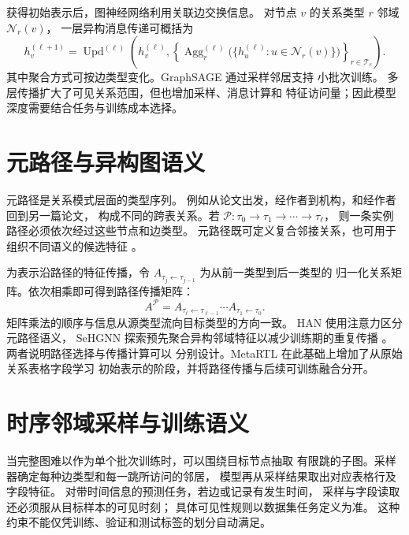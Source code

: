 获得初始表示后，图神经网络利用关联边交换信息。
对节点 $v$ 的关系类型 $r$ 邻域 $\mathcal N_r(v)$，
一层异构消息传递可概括为
\begin{equation}
  h_v^{(\ell+1)}
  =\operatorname{Upd}^{(\ell)}
   \left(h_v^{(\ell)},
   \left\{
      \operatorname{Agg}^{(\ell)}_r
      \bigl(\{h_u^{(\ell)}:u\in\mathcal N_r(v)\}\bigr)
      \right\}_{r\in\mathcal T_e}
   \right).
  \label{eq:background-message}
\end{equation}
其中聚合方式可按边类型变化。GraphSAGE 通过采样邻居支持
小批次训练\cite{hamilton2017graphsage}。
多层传播扩大了可见关系范围，但也增加采样、消息计算和
特征访问量；因此模型深度需要结合任务与训练成本选择。

\section{元路径与异构图语义}

元路径是关系模式层面的类型序列。
例如从论文出发，经作者到机构，和经作者回到另一篇论文，
构成不同的跨表关系。若
$\mathcal P:\tau_0\rightarrow\tau_1\rightarrow\cdots\rightarrow\tau_\ell$，
则一条实例路径必须依次经过这些节点和边类型。
元路径既可定义复合邻接关系，也可用于组织不同语义的候选特征
\cite{dong2017metapath2vec}。

为表示沿路径的特征传播，令
$A_{\tau_j\leftarrow\tau_{j-1}}$ 为从前一类型到后一类型的
归一化关系矩阵。依次相乘即可得到路径传播矩阵：
\begin{equation}
  A^{\mathcal P}
  =A_{\tau_\ell\leftarrow\tau_{\ell-1}}
   \cdots A_{\tau_1\leftarrow\tau_0}.
  \label{eq:background-path-product}
\end{equation}
矩阵乘法的顺序与信息从源类型流向目标类型的方向一致。
HAN 使用注意力区分元路径语义\cite{wang2019han}，
SeHGNN 探索预先聚合异构邻域特征以减少训练期的重复传播
\cite{yang2023sehgnn}。两者说明路径选择与传播计算可以
分别设计。MetaRTL 在此基础上增加了从原始关系表格字段学习
初始表示的阶段，并将路径传播与后续可训练融合分开。

\section{时序邻域采样与训练语义}

当完整图难以作为单个批次训练时，可以围绕目标节点抽取
有限跳的子图。采样器确定每种边类型和每一跳所访问的邻居，
模型再从采样结果取出对应表格行及字段特征。
对带时间信息的预测任务，若边或记录有发生时间，
采样与字段读取还必须服从目标样本的可见时刻；
具体可见性规则以数据集任务定义为准。
这种约束不能仅凭训练、验证和测试标签的划分自动满足。

